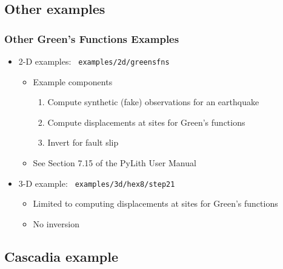\documentclass{beamer}
\begin{document}
\subsection{Other examples}
\begin{frame}
  \frametitle{Other Green's Functions Examples}
  \summary{}

  \begin{itemize}
  \item 2-D examples: {\tt\color{red} examples/2d/greensfns}
    \begin{itemize}
    \item Example components
      \begin{enumerate}
      \item Compute synthetic (fake) observations for an earthquake
      \item Compute displacements at sites for Green's functions
      \item Invert for fault slip
      \end{enumerate}
    \item See Section 7.15 of the PyLith User Manual
    \end{itemize}
  \item 3-D example: {\tt\color{red} examples/3d/hex8/step21}
    \begin{itemize}
    \item Limited to computing displacements at sites for Green's functions
    \item No inversion
    \end{itemize}
  \end{itemize}
  
\end{frame}


\subsection{Cascadia example}
\end{document}
